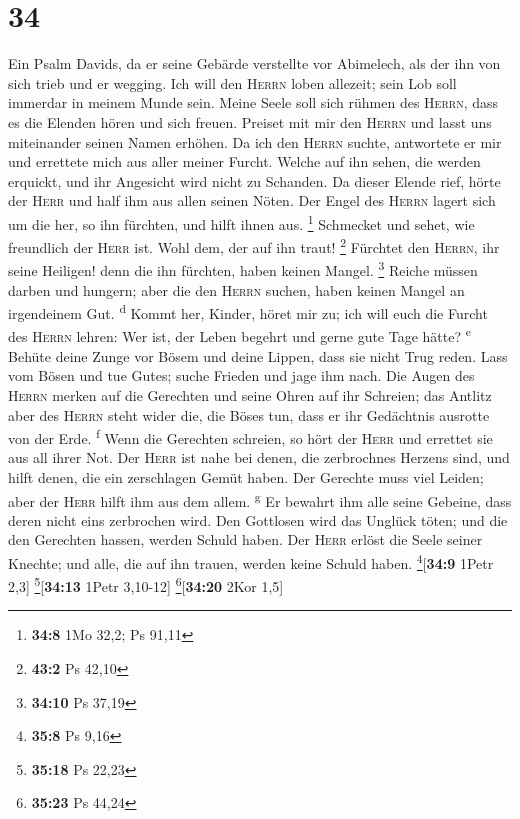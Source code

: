 \hypertarget{section-33}{%
\section{34}\label{section-33}}

 Ein Psalm Davids, da er seine Gebärde verstellte vor
Abimelech, als der ihn von sich trieb und er wegging.  Ich
will den \textsc{Herrn} loben allezeit; sein Lob soll immerdar in meinem
Munde sein.  Meine Seele soll sich rühmen des
\textsc{Herrn}, dass es die Elenden hören und sich freuen.
 Preiset mit mir den \textsc{Herrn} und lasst uns
miteinander seinen Namen erhöhen.  Da ich den
\textsc{Herrn} suchte, antwortete er mir und errettete mich aus aller
meiner Furcht.  Welche auf ihn sehen, die werden erquickt,
und ihr Angesicht wird nicht zu Schanden.  Da dieser
Elende rief, hörte der \textsc{Herr} und half ihm aus allen seinen
Nöten.  Der Engel des \textsc{Herrn} lagert sich um die
her, so ihn fürchten, und hilft ihnen aus. \footnote{\textbf{34:8} 1Mo
  32,2; Ps 91,11}  Schmecket und sehet, wie freundlich der
\textsc{Herr} ist. Wohl dem, der auf ihn traut! \footnote{\textbf{43:2}
  Ps 42,10}  Fürchtet den \textsc{Herrn}, ihr seine
Heiligen! denn die ihn fürchten, haben keinen Mangel. \footnote{\textbf{34:10}
  Ps 37,19}  Reiche müssen darben und hungern; aber die
den \textsc{Herrn} suchen, haben keinen Mangel an irgendeinem Gut.
\textsuperscript{d}  Kommt her, Kinder, höret mir zu; ich
will euch die Furcht des \textsc{Herrn} lehren:  Wer ist,
der Leben begehrt und gerne gute Tage hätte? \textsuperscript{e}
 Behüte deine Zunge vor Bösem und deine Lippen, dass sie
nicht Trug reden.  Lass vom Bösen und tue Gutes; suche
Frieden und jage ihm nach.  Die Augen des \textsc{Herrn}
merken auf die Gerechten und seine Ohren auf ihr Schreien;
 das Antlitz aber des \textsc{Herrn} steht wider die, die
Böses tun, dass er ihr Gedächtnis ausrotte von der Erde.
\textsuperscript{f}  Wenn die Gerechten schreien, so hört
der \textsc{Herr} und errettet sie aus all ihrer Not. 
Der \textsc{Herr} ist nahe bei denen, die zerbrochnes Herzens sind, und
hilft denen, die ein zerschlagen Gemüt haben.  Der
Gerechte muss viel Leiden; aber der \textsc{Herr} hilft ihm aus dem
allem. \textsuperscript{g}  Er bewahrt ihm alle seine
Gebeine, dass deren nicht eins zerbrochen wird.  Den
Gottlosen wird das Unglück töten; und die den Gerechten hassen, werden
Schuld haben.  Der \textsc{Herr} erlöst die Seele seiner
Knechte; und alle, die auf ihn trauen, werden keine Schuld haben.
\footnote{\textbf{35:8} Ps 9,16}{[}\textbf{34:9} 1Petr 2,3{]}
\footnote{\textbf{35:18} Ps 22,23}{[}\textbf{34:13} 1Petr 3,10-12{]}
\footnote{\textbf{35:23} Ps 44,24}{[}\textbf{34:20} 2Kor 1,5{]}

